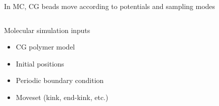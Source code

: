 \documentclass[aspectratio=169]{beamer}
\begin{document}
\begin{frame}[t]{In MC, CG beads move according to potentials and sampling modes}
  \centering

  \begin{columns}[T]

    \centering
    \vspace{-0.5\baselineskip}

    \begin{block}{Molecular simulation inputs}
      \centering

      \begin{itemize}

        \item CG polymer model
        \item Initial positions
        \item Periodic boundary condition
        \item Moveset (kink, end-kink, etc.)
      \end{itemize}

    \end{block}





\end{columns}
\end{frame}
\end{document}
